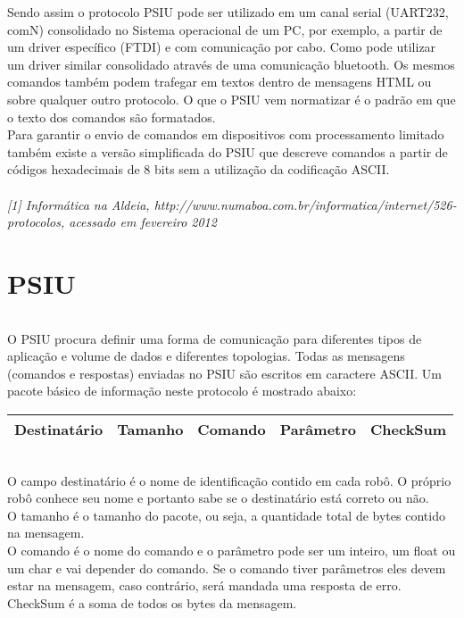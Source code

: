 \documentclass[11pt,a4paper]{article}
\begin{document}
Sendo assim o protocolo PSIU pode ser utilizado em um canal serial (UART232, comN) consolidado no Sistema operacional de um PC, por exemplo, a partir de um driver específico (FTDI) e com comunicação por cabo. Como pode utilizar um driver similar consolidado através de uma comunicação bluetooth. Os mesmos comandos também podem trafegar em textos dentro de mensagens HTML ou sobre qualquer outro protocolo. O que o PSIU vem normatizar é o padrão em que o texto dos comandos são formatados.\\

Para garantir o envio de comandos em dispositivos com processamento limitado também existe a versão simplificada do PSIU que descreve comandos a partir de códigos hexadecimais de 8 bits sem a utilização da codificação ASCII. \\ \\

\textsl{[1] Informática na Aldeia, http://www.numaboa.com.br/informatica/internet/526-protocolos, acessado em fevereiro 2012}

\newpage

\part*{PSIU \newline}

\paragraph{} O PSIU procura definir uma forma de comunicação para diferentes tipos
de aplicação e volume de dados e diferentes topologias. Todas as mensagens (comandos e respostas) enviadas no PSIU são escritos em caractere ASCII. Um pacote básico de
informação neste protocolo é mostrado abaixo: \\


\begin{table}[ht]
	\centering
	\begin{tabular}{lllll}
		\toprule
		Destinatário & Tamanho & Comando & Parâmetro & CheckSum \\
		\bottomrule
	\end{tabular}
	\label{tab:formatoslatex} %
\end{table}



\paragraph{}O campo destinatário é o nome de identificação contido em cada robô. O próprio robô conhece seu nome e portanto sabe se o destinatário está correto ou não.\\ O tamanho é o tamanho do pacote, ou seja, a quantidade total de bytes contido na mensagem. \\ 
O comando é o nome do comando e o parâmetro pode ser um inteiro, um float ou um char e vai depender do comando. Se o comando tiver parâmetros eles devem estar na mensagem, caso contrário, será mandada uma resposta de erro.  \\
CheckSum é a soma de todos os bytes da mensagem.
\end{document}
